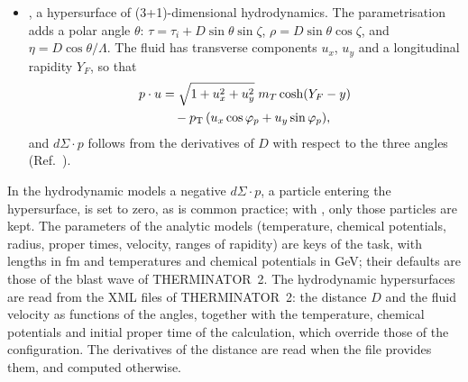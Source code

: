 \begin{itemize}
  $\rho = D\cos\zeta$. The fluid has a transverse velocity $v_T(\zeta,\varphi)$ at an azimuth $\varphi + \varphi_F$, and
  \begin{align}
    p\cdot u & = \gamma_T\bigl(m_T\cosh(y-\eta) \nonumber\\ & \quad - v_T\pT\cos(\varphi-\varphi_p+\varphi_F)\bigr), \\
    d\Sigma\cdot p & = D\,\tau\,\bigl[D\cos\zeta\,(m_T\sin\zeta\,C + \pT\cos\zeta\,c) \nonumber\\
    & \quad + \partial_\zeta D\,\cos\zeta\,(\pT\sin\zeta\,c - m_T\cos\zeta\,C) \nonumber\\
    & \quad + \partial_\varphi D\,\pT\,s\bigr],
  \end{align}
  with $C = \cosh(y-\eta)$, $c = \cos(\varphi-\varphi_p)$ and $s = \sin(\varphi-\varphi_p)$.
  \item {}, a hypersurface of (3+1)-dimensional hydrodynamics. The parametrisation adds a polar angle
  $\theta$: $\tau = \tau_i + D\sin\theta\sin\zeta$, $\rho = D\sin\theta\cos\zeta$, and $\eta = D\cos\theta/\Lambda$. The
  fluid has transverse components $u_x$, $u_y$ and a longitudinal rapidity $Y_F$, so that
  \begin{align}
    p\cdot u & = \sqrt{1+u_x^2+u_y^2}\; m_T\cosh(Y_F-y) \nonumber\\
    & \quad - p_{\mathrm{T}}\,(u_x\cos\varphi_p + u_y\sin\varphi_p),
  \end{align}
  and $d\Sigma\cdot p$ follows from the derivatives of $D$ with respect to the three angles (Ref.~\cite{Chojnacki:2011hb}).
\end{itemize}
In the hydrodynamic models a negative $d\Sigma\cdot p$, a particle entering the hypersurface, is set to zero, as is
common practice; with , only those particles are kept. The parameters of the analytic models
(temperature, chemical potentials, radius, proper times, velocity, ranges of rapidity) are keys of the task, with
lengths in fm and temperatures and chemical potentials in GeV; their defaults are those of the blast wave of
THERMINATOR~2. The hydrodynamic hypersurfaces are read from the XML files of THERMINATOR~2: the distance $D$ and the
fluid velocity as functions of the angles, together with the temperature, chemical potentials and initial proper time
of the calculation, which override those of the configuration. The derivatives of the distance are read when the file
provides them, and computed otherwise.

